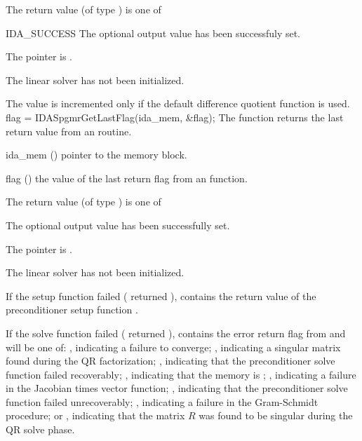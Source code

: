 {
  The return value  (of type ) is one of
  \begin{args}
  \item[IDA\_SUCCESS] 
    The optional output value has been successfuly set.
  \item[\Id{IDASPGMR\_MEM\_NULL}]
    The  pointer is .
  \item[\Id{IDASPGMR\_LMEM\_NULL}]
    The {\idaspgmr} linear solver has not been initialized.
  \end{args}
}
{
  The value  is incremented only if the default 
   difference quotient function is used.
}
{
  flag = IDASpgmrGetLastFlag(ida\_mem, \&flag);
}
{
  The function  returns the
  last return value from an {\idaspgmr} routine. 
}
{
  \begin{args}
  \item[ida\_mem] ()
    pointer to the {\ida} memory block.
  \item[flag] ()
    the value of the last return flag from an {\idaspgmr} function.
  \end{args}
}
{
  The return value  (of type ) is one of
  \begin{args}
  \item[\Id{IDASPGMR\_SUCCESS}] 
    The optional output value has been successfully set.
  \item[\Id{IDASPGMR\_MEM\_NULL}]
    The  pointer is .
  \item[\Id{IDASPGMR\_LMEM\_NULL}]
    The {\idaspgmr} linear solver has not been initialized.
  \end{args}
}
{
  If the {\idaspgmr} setup function failed ( 
  returned ),
   contains the return value of the preconditioner 
  setup function .

  If the {\idaspgmr} solve function failed ( returned 
  ),  contains the error return flag from
   and will be one of:
  , indicating a failure to converge;
  , indicating a singular matrix found during the
  QR factorization;
  , indicating that the preconditioner solve
  function  failed recoverably;
  , indicating that the {\spgmr} memory is ;
  , indicating a failure in the Jacobian times vector 
  function;
  , indicating that the preconditioner solve
  function  failed unrecoverably;
  , indicating a failure in the Gram-Schmidt procedure;
  or , indicating that the matrix $R$ was found to 
  be singular during the QR solve phase.
}

